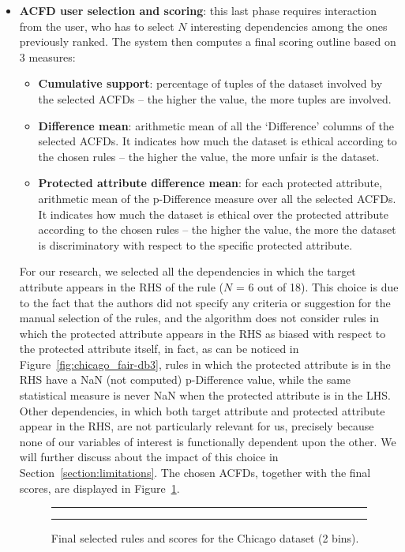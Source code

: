 \begin{itemize}
\item \textbf{ACFD user selection and scoring}: this last phase requires interaction from the user, who has to select \(N\) interesting dependencies among the ones previously ranked. The system then computes a final scoring outline based on 3 measures:
\begin{itemize}
\item \textbf{Cumulative support}: percentage of tuples of the dataset involved by the selected ACFDs -- the higher the value, the more tuples are involved.
\item \textbf{Difference mean}: arithmetic mean of all the `Difference' columns of the selected ACFDs. It indicates how much the dataset is ethical according to the chosen rules -- the higher the value, the more unfair is the dataset.
\item \textbf{Protected attribute difference mean}: for each protected attribute, arithmetic mean of the p-Difference measure over all the selected ACFDs. It indicates how much the dataset is ethical over the protected attribute according to the chosen rules -- the higher the value, the more the dataset is discriminatory with respect to the specific protected attribute.
\end{itemize}

For our research, we selected all the dependencies in which the target attribute appears in the RHS of the rule (\(N\) = 6 out of 18). This choice is due to the fact that the authors did not specify any criteria or suggestion for the manual selection of the rules, and the algorithm does not consider rules in which the protected attribute appears in the RHS as biased with respect to the protected attribute itself, in fact, as can be noticed in Figure~\ref{fig:chicago_fair-db3}, rules in which the protected attribute is in the RHS have a NaN (not computed) p-Difference value, while the same statistical measure is never NaN when the protected attribute is in the LHS. Other dependencies, in which both target attribute and protected attribute appear in the RHS, are not particularly relevant for us, precisely because none of our variables of interest is functionally dependent upon the other. We will further discuss about the impact of this choice in Section~\ref{section:limitations}. The chosen ACFDs, together with the final scores, are displayed in Figure~\ref{fig:chicago_fair-db4}.

\begin{figure}[t!]
\centering
\noindent\rule{\linewidth}{0.4pt}\par
\noindent\rule{\linewidth}{0.4pt}
\caption{Final selected rules and scores for the Chicago dataset (2 bins).}
\label{fig:chicago_fair-db4}
\end{figure}
\end{itemize}

